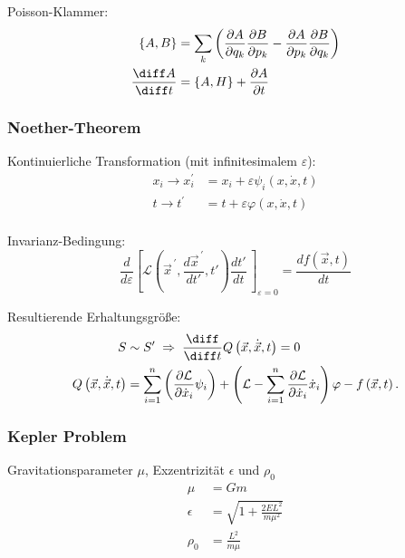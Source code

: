 \documentclass[11pt]{article}
\numberwithin{equation}{section}
\begin{document}
        Poisson-Klammer:
        \begin{equation}
          \begin{aligned}
            \lbrace A, B \rbrace &= \sum_k \left(
              \pder{A}{q_k}\pder{B}{p_k} - \pder{A}{p_k}\pder{B}{q_k}
            \right) \\
            \tder{A}{t} &= \cBr{A, H} + \pder{A}{t}
          \end{aligned}
        \end{equation}

      \subsubsection{Noether-Theorem}
        Kontinuierliche Transformation (mit infinitesimalem $\varepsilon$):
        \begin{equation}
          \begin{aligned}
          x_i \rightarrow x_{i}^{\prime} &= x_i+\varepsilon\psi_i\left(x,\dot{x},t\right) \\
            t\rightarrow t^{\prime}\, &= t+\varepsilon\varphi\left(x,\dot{x},t\right) \\
          \end{aligned}
        \end{equation}

        Invarianz-Bedingung:
        \begin{equation}
          \frac{d}{d\varepsilon}\left[\mathcal{L}\left( {\vec{x}}^{\,\prime},\frac{d {\vec{x}}^{\,\prime}}{dt'},t'\right) \frac{dt'}{dt}\,\right]_{\varepsilon=0}=\frac{df(\vec{x}, t)}{dt}
        \end{equation}

        Resultierende Erhaltungsgröße:
        \begin{equation}
          \begin{aligned}
            S &\sim S' \;\Rightarrow\;
            \tder{}{t} Q\left(\vec{x},\dot{\vec{x}},t\right) = 0 \\
            Q\left(\vec{x},\dot{\vec{x}},t\right) &= \sum_{i=1}^{n}\left(\frac{\partial\mathcal{L}}{\partial{\dot{x}}_i}\psi_i\right)+\left(\mathcal{L}-\sum_{i=1}^{n}{\frac{\partial\mathcal{L}}{\partial{\dot{x}}_i}{\dot{x}}_i}\right)\varphi - f\left(\vec{x},t\right).
          \end{aligned}
        \end{equation}

      \subsubsection{Kepler Problem}
        Gravitationsparameter $\mu$, Exzentrizität $\epsilon$ und $\rho_0$
        \begin{equation}
          \begin{aligned}
            \mu &= G m \\
            \epsilon &= \sqrt{1+\frac{2 E L^2}{m \mu^2}} \\
            \rho_0 &= \frac{L^2}{m\mu} \\
          \end{aligned}
        \end{equation}
\end{document}
